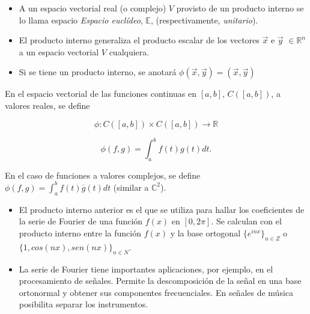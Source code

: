 \bigskip

\begin{remark}
\label{ObsPII}
\begin{itemize}
    \item 
A un espacio vectorial real  (o complejo) $V$ provisto de un producto interno se lo llama espacio  \textit{Espacio euclídeo}, $\mathbb{E}$, (respectivamente, \textit{unitario}). 
    \item

El producto interno generaliza el producto escalar de los vectores $\Vec{x}$ e $\Vec{y}$ $ \in \mathbb{R}^n$ a un espacio vectorial $V$ cualquiera.
    \item 
Si se tiene un producto interno, se anotará   $\phi(\vec{x},\vec{y})=(\vec{x},\vec{y})$
\end{itemize}
\end{remark}


\bigskip





\begin{example}
\label{PRODINTL2}
En el espacio vectorial de las funciones continuas en $[a,b]$, $C([a,b])$, a valores reales,  se define

$$\phi :  C([a,b]) \times C([a,b]) \rightarrow \mathbb{R}$$

$$ \phi(f,g)=  \int_a^b  f(t) g(t) dt.$$

\bigskip

En el caso de funciones a valores complejos,  se define $ \phi(f,g)=  \int_a^b  f(t) \overline g(t) dt$  (similar a $\mathbb{C}^2$).

\end{example}
\begin{remark}
\begin{itemize}
    \item
El producto interno anterior es el que se utiliza para hallar los coeficientes de la serie de Fourier de una función $f(x)$  en $[0, 2 \pi]$.  Se calculan con el producto interno entre la función $f(x)$ y la base ortogonal $ \{e^{inx}\}_{n \in Z}$ o $\{1, cos(nx), sen(nx)\}_{n \in N}$.
\item
La serie de Fourier tiene importantes aplicaciones, por ejemplo, en el procesamiento de señales. Permite la descomposición de la señal en una base ortonormal y obtener sus componentes frecuenciales. En señales de música posibilita  separar los instrumentos.
\end{itemize}
\end{remark}


